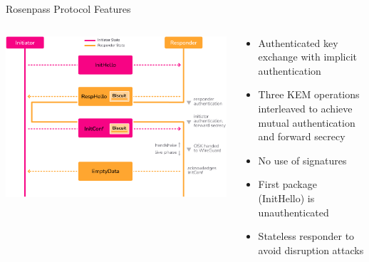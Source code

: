 \begin{frame}{Rosenpass Protocol Features}
\hypertarget{the-rosenpass-protocol-1}{}



  \begin{columns}[fullwidth,c]
    \begin{column}{.5\linewidth}
\includegraphics[width=\linewidth]{graphics/rosenpass-wp-key-exchange-protocol-rgb.pdf}
    \end{column}

    \begin{column}{.5\linewidth}
      \begin{itemize}
        \item Authenticated key exchange with implicit authentication
        \item Three KEM operations interleaved to achieve mutual authentication and forward secrecy
        \item No use of signatures
        \item First package (InitHello) is unauthenticated
        \item Stateless responder to avoid disruption attacks
      \end{itemize}
    \end{column}
  \end{columns}
\end{frame}

